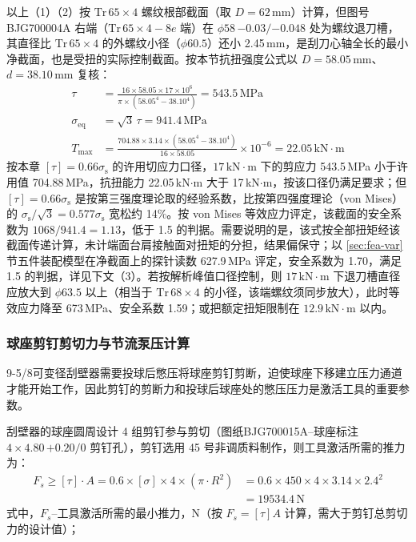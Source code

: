 以上（1）（2）按 $\mathrm{Tr}\,65\times4$ 螺纹根部截面（取 $D=62$\,mm）计算，但图号 BJG700004A 右端（$\mathrm{Tr}\,65\times4-8e$ 端）在 $\phi 58\,{-0.03}/{-0.048}$ 处为螺纹退刀槽，其直径比 $\mathrm{Tr}\,65\times4$ 的外螺纹小径（$\phi 60.5$）还小 2.45\,mm，是刮刀心轴全长的最小净截面，也是受扭的实际控制截面。按本节抗扭强度公式以 $D=58.05$\,mm、$d=38.10$\,mm 复核：
\begin{equation}
    \begin{aligned}
    \tau &= \frac{16 \times 58.05 \times 17 \times 10^{6}}{\pi \times (58.05^4 - 38.10^4)} = 543.5\,\mathrm{MPa} \\
    \sigma_{\mathrm{eq}} &= \sqrt{3}\,\tau = 941.4\,\mathrm{MPa} \\
    T_{\max} &= \frac{704.88 \times 3.14 \times (58.05^4 - 38.10^4)}{16 \times 58.05} \times 10^{-6} = 22.05\,\mathrm{kN}\cdot\mathrm{m}
    \end{aligned}
\end{equation}
按本章 $[\tau]=0.66\sigma_{\mathrm{s}}$ 的许用切应力口径，$17\,\mathrm{kN}\cdot\mathrm{m}$ 下的剪应力 543.5\,MPa 小于许用值 704.88\,MPa，抗扭能力 22.05\,kN$\cdot$m 大于 17\,kN$\cdot$m，按该口径仍满足要求；但 $[\tau]=0.66\sigma_{\mathrm{s}}$ 是按第三强度理论取的经验系数，比按第四强度理论（von Mises）的 $\sigma_{\mathrm{s}}/\sqrt{3}=0.577\sigma_{\mathrm{s}}$ 宽松约 14\%。按 von Mises 等效应力评定，该截面的安全系数为 $1068/941.4=1.13$，低于 1.5 的判据。需要说明的是，该式按全部扭矩经该截面传递计算，未计端面台肩接触面对扭矩的分担，结果偏保守；以 \ref{sec:fea-var} 节五件装配模型在净截面上的探针读数 627.9\,MPa 评定，安全系数为 1.70，满足 1.5 的判据，详见下文（3）。若按解析峰值口径控制，则 $17\,\mathrm{kN}\cdot\mathrm{m}$ 下退刀槽直径应放大到 $\phi 63.5$ 以上（相当于 $\mathrm{Tr}\,68\times4$ 的小径，该端螺纹须同步放大），此时等效应力降至 673\,MPa、安全系数 1.59；或把额定扭矩限制在 $12.9\,\mathrm{kN}\cdot\mathrm{m}$ 以内。


\subsubsection{球座剪钉剪切力与节流泵压计算}

9-5/8\inch 可变径刮壁器需要投球后憋压将球座剪钉剪断，迫使球座下移建立压力通道才能开始工作，因此剪钉的剪断力和投球后球座处的憋压压力是激活工具的重要参数。

刮壁器的球座圆周设计 4 组剪钉参与剪切（图纸BJG700015A--球座标注 $4\times 4.80\,{+0.20}/0$ 剪钉孔），剪钉选用 45 号非调质料制作，则工具激活所需的推力为：
\begin{equation}
    \begin{aligned}
        F_s \ge [\tau] \cdot A = 0.6 \times [\sigma] \times 4 \times (\pi \cdot R^2) &= 0.6 \times 450 \times 4 \times 3.14 \times 2.4^2 \\
        &= 19534.4\,\mathrm{N}
    \end{aligned}
\end{equation}
式中，$F_s$--工具激活所需的最小推力，N（按 $F_s = [\tau]A$ 计算，需大于剪钉总剪切力的设计值）；

